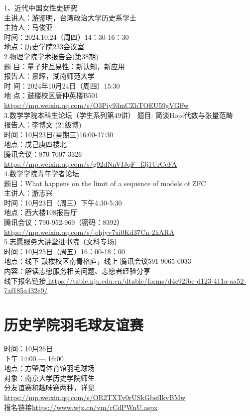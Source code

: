 \documentclass[letterpaper, 12pt]{article}
\begin{document}
\begin{multicols}{2}
1、近代中国女性史研究\\
主讲人：游鉴明，台湾政治大学历史系学士\\
主持人：马俊亚\\
时间：2024.10.24（周四）14：30-16：30\\
地点：历史学院233会议室\\
2.物理学院学术报告会(第38期)\\
题   目：量子非互易性：新认知，新应用\\
报告人：景辉，湖南师范大学\\
时   间：2024年10月24日（周四）15:30\\
地   点：鼓楼校区唐仲英楼B501\\
\url{https://mp.weixin.qq.com/s/O3Piy93mCZhTOEU59gVGFw}\\
3.数学学院本科生论坛（学生系列第49讲）
题目: 简谈Hopf代数与张量范畴\\
报告人：李博文 (21级博)\\
时间：10月23日(星期三)16:00-17:30\\
地点：戊己庚四楼北\\
腾讯会议：870-7007-3326\\
\url{https://mp.weixin.qq.com/s/g92dNnVIJqF_f3j1UrCcFA}\\
4.数学学院青年学者论坛\\
题目：What happens on the limit of a sequence of models of ZFC\\
主讲人：游志兴\\
时间：10月23日（周三）下午4:30-5:30\\
地点：西大楼108报告厅\\
腾讯会议：790-952-969（密码：8392）\\
\url{https://mp.weixin.qq.com/s/-ehjyv7ai0Kd37Cn-2kARA}\\
5.志愿服务大讲堂进书院（文科专场）\\
时间：10月25日（周五）16：00-18：00\\
地点：线下-鼓楼校区南青格庐，线上-腾讯会议591-9065-0033\\
内容：解读志愿服务相关问题、志愿者经验分享\\
线下报名链接\url{
https://table.nju.edu.cn/dtable/forms/d4c92fbc-d123-411a-aa52-7af185a432e9/}\\
\section{历史学院羽毛球友谊赛}
时间：10月26日\\下午 14:00 — 16:00\\地点：方肇周体育馆羽毛球场\\对象：南京大学历史学院师生\\
分友谊赛和趣味赛两种，详见\url{https://mp.weixin.qq.com/s/OR2TXTv0rUSkGbefIkvBMw}\\
报名链接\url{https://www.wjx.cn/vm/rCdPWnU.aspx}

\end{multicols}
\end{document}
